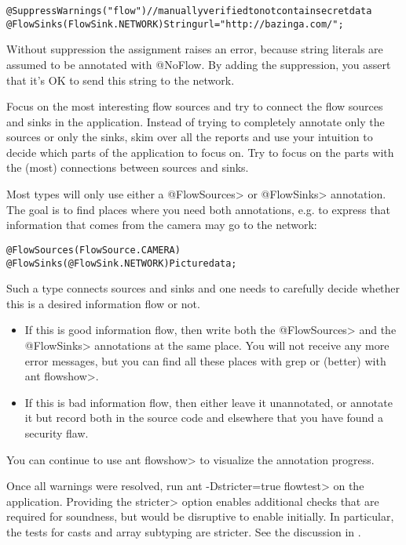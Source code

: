 \begin{alltt}
    @SuppressWarnings("flow") // manually verified to not contain secret data
    @FlowSinks(FlowSink.NETWORK) String url = "http://bazinga.com/";
\end{alltt}

\noindent
Without suppression the assignment raises an error, because string literals
are assumed to be annotated with @NoFlow. By adding the suppression, you
assert that it's OK to send this string to the network. 

Focus on the most interesting flow sources and try to connect the flow
sources and sinks in the application. Instead of trying to completely
annotate only the sources or only the sinks, skim over all the reports
and use your intuition to decide which parts of the application to
focus on. Try to focus on the parts with the (most) connections
between sources and sinks.

Most types will only use either a \<@FlowSources> or \<@FlowSinks>
annotation.
The goal is to find places where you need both annotations, e.g. to
express that information that comes from the camera may go to the
network:

\begin{alltt}
    @FlowSources(FlowSource.CAMERA)
    @FlowSinks(@FlowSink.NETWORK) Picture data;
\end{alltt}

Such a type connects sources and sinks and one needs to carefully
decide whether this is a desired information flow or not.
\begin{itemize}
\item If this is good information flow, then write both the \<@FlowSources>
  and the \<@FlowSinks> annotations at the same place. You will not
  receive any more error messages, but you can find all these places
  with grep or (better) with \<ant flowshow>.
\item If this is bad information flow, then either leave it unannotated,
  or annotate it but record both in the source code and elsewhere that
  you have found a security flaw.
\end{itemize}

You can continue to use \<ant flowshow> to visualize the annotation
progress.

Once all warnings were resolved, run \<ant -Dstricter=true flowtest> on
the application.
Providing the \<stricter> option enables additional checks that are
required for soundness, but would be disruptive to enable initially.
In particular, the tests for casts and array subtyping are stricter.
See the discussion in .



